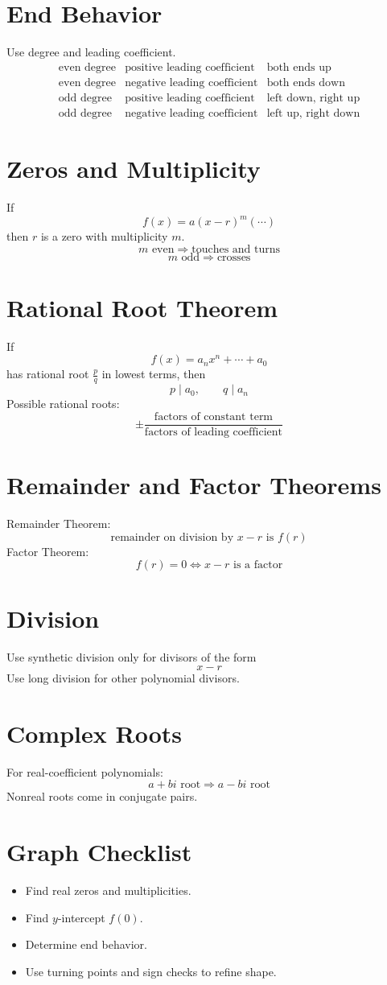 \documentclass[11pt]{article}
\begin{document}

\section*{End Behavior}
Use degree and leading coefficient.
\[
\begin{array}{lll}
\text{even degree} & \text{positive leading coefficient} & \text{both ends up}\\
\text{even degree} & \text{negative leading coefficient} & \text{both ends down}\\
\text{odd degree} & \text{positive leading coefficient} & \text{left down, right up}\\
\text{odd degree} & \text{negative leading coefficient} & \text{left up, right down}
\end{array}
\]

\section*{Zeros and Multiplicity}
If
\[
f(x)=a(x-r)^m(\cdots)
\]
then $r$ is a zero with multiplicity $m$.
\[
m\text{ even}\Rightarrow \text{touches and turns}
\]
\[
m\text{ odd}\Rightarrow \text{crosses}
\]

\section*{Rational Root Theorem}
If
\[
f(x)=a_nx^n+\cdots+a_0
\]
has rational root $\frac pq$ in lowest terms, then
\[
p\mid a_0,\qquad q\mid a_n
\]
Possible rational roots:
\[
\pm\frac{\text{factors of constant term}}{\text{factors of leading coefficient}}
\]

\section*{Remainder and Factor Theorems}
Remainder Theorem:
\[
\text{remainder on division by }x-r\text{ is }f(r)
\]
Factor Theorem:
\[
f(r)=0\iff x-r\text{ is a factor}
\]

\section*{Division}
Use synthetic division only for divisors of the form
\[
x-r
\]
Use long division for other polynomial divisors.

\section*{Complex Roots}
For real-coefficient polynomials:
\[
a+bi\text{ root}\Rightarrow a-bi\text{ root}
\]
Nonreal roots come in conjugate pairs.

\section*{Graph Checklist}
\begin{itemize}
  \item Find real zeros and multiplicities.
  \item Find \(y\)-intercept $f(0)$.
  \item Determine end behavior.
  \item Use turning points and sign checks to refine shape.
\end{itemize}
\end{document}

